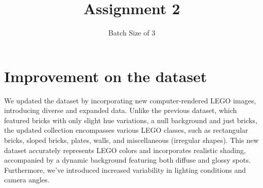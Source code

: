 \documentclass[]{article}
\title{Assignment 2}
\author{Batch Size of 3}
\begin{document}
\maketitle

\clearpage
\section{Improvement on the dataset}
We updated the dataset by incorporating new computer-rendered LEGO images, introducing diverse and expanded data. Unlike the previous dataset, which featured bricks with only slight hue variations, a null background and just bricks, the updated collection encompasses various LEGO classes, such as rectangular bricks, sloped bricks, plates, walls, and miscellaneous (irregular shapes). This new dataset accurately represents LEGO colors and incorporates realistic shading, accompanied by a dynamic background featuring both diffuse and glossy spots. Furthermore, we've introduced increased variability in lighting conditions and camera angles. \\
\end{document}
